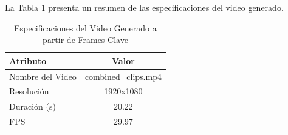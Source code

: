La Tabla \ref{tab:video_info} presenta un resumen de las especificaciones del video generado.

\begin{table}[H]
    \centering
    \caption{Especificaciones del Video Generado a partir de Frames Clave}
    \begin{tabular}{l c}
        \hline
        \textbf{Atributo} & \textbf{Valor} \\
        \hline
        Nombre del Video & combined\_clips.mp4 \\
        Resolución & 1920x1080 \\
        Duración (s) & 20.22 \\
        FPS & 29.97 \\
        \hline
    \end{tabular}
    \label{tab:video_info}
\end{table}

